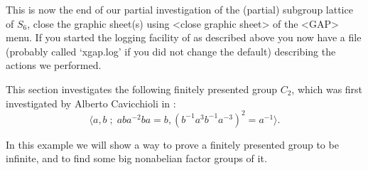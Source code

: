 %
%
%
%


This is  now the  end of our  partial  investigation of  the (partial)
subgroup  lattice  of $S_6$, close  the  graphic sheet(s) using <close
graphic sheet> of the <GAP> menu. If you started the logging facility
of {\XGAP} as described above you now have a file (probably called
`xgap.log' if you did not change the default) describing the actions
we performed.



This  section  investigates the  following  finitely presented group $C_2$,
which was first investigated by Alberto Cavicchioli in \cite{Cav86}:
$$
\langle a, b \;;\; aba^{-2}ba=b, (b^{-1}a^3b^{-1}a^{-3})^2=a^{-1}\rangle.
$$

In this example we will show a way to prove a finitely presented group
to be infinite, and to find some big nonabelian factor groups of it.

